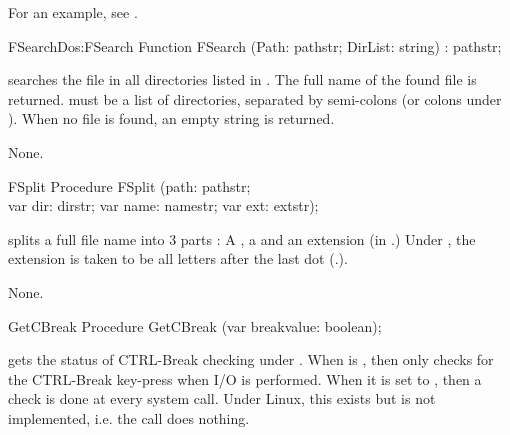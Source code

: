 For an example, see .
\begin{functionl}{FSearch}{Dos:FSearch}
\Declaration
Function FSearch (Path: pathstr; DirList: string) : pathstr;

\Description
{} searches the file  in all directories listed in
. The full name of the found file is returned.
 must be a list of directories, separated by semi-colons (or
colons under \linux).
When no file is found, an empty string is returned.

\Errors
None.
\SeeAlso
{}
\end{functionl}
\latex{}
\html{}
 
\begin{procedure}{FSplit}
\Declaration
Procedure FSplit (path: pathstr; \\ var dir: dirstr; var name: namestr;
  var ext: extstr);

\Description

 splits a full file name into 3 parts : A , a
 and an extension  (in .) 
Under \linux, the extension is taken to be all letters after the last dot
(.).

\Errors
None.
\SeeAlso
{}
\end{procedure}
\latex{}
\html{}
\begin{procedure}{GetCBreak}
\Declaration
Procedure GetCBreak (var breakvalue: boolean);

\Description

 gets the status of CTRL-Break checking under \dos.
When  is , then \dos only checks for the 
CTRL-Break key-press when I/O is performed. When it is set to ,
then a check is done at every system call.
\Errors
Under Linux, this exists but is 
not implemented, i.e. the call does nothing.
\SeeAlso
{}
\end{procedure}

